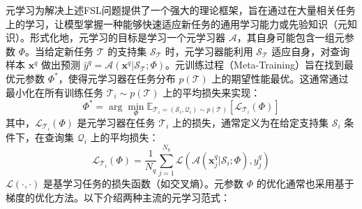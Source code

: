 元学习为解决上述FSL问题提供了一个强大的理论框架，旨在通过在大量相关任务上的学习，让模型掌握一种能够快速适应新任务的通用学习能力或先验知识（元知识）。形式化地，元学习的目标是学习一个元学习器 $\mathcal{A}$，其自身可能包含一组元参数 $\Phi$。当给定新任务 $\mathcal{T}$ 的支持集 $\mathcal{S}_{\mathcal{T}}$ 时，元学习器能利用 $\mathcal{S}_{\mathcal{T}}$ 适应自身，对查询样本 $\mathbf{x}^q$ 做出预测 $\hat{y}^q = \mathcal{A}(\mathbf{x}^q | \mathcal{S}_{\mathcal{T}}; \Phi)$。元训练过程（Meta-Training）旨在找到最优元参数 $\Phi^*$，使得元学习器在任务分布 $p(\mathcal{T})$ 上的期望性能最优。这通常通过最小化在所有训练任务 $\mathcal{T}_i \sim p(\mathcal{T})$ 上的平均损失来实现：
\begin{equation}
    \Phi^* = \arg\min_{\Phi} \mathbb{E}_{\mathcal{T}_i=(\mathcal{S}_i, \mathcal{Q}_i) \sim p(\mathcal{T})} [\mathcal{L}_{\mathcal{T}_i}(\Phi)]
    \label{eq:meta_objective}
\end{equation}
其中，$\mathcal{L}_{\mathcal{T}_i}(\Phi)$ 是元学习器在任务 $\mathcal{T}_i$ 上的损失，通常定义为在给定支持集 $\mathcal{S}_i$ 条件下，在查询集 $\mathcal{Q}_i$ 上的平均损失：
\begin{equation}
    \mathcal{L}_{\mathcal{T}_i}(\Phi) = \frac{1}{N_q} \sum_{j=1}^{N_q} \mathcal{L}( \mathcal{A}(\mathbf{x}_j^q | \mathcal{S}_i; \Phi), y_j^q )
    \label{eq:task_loss_meta}
\end{equation}
$\mathcal{L}(\cdot, \cdot)$ 是基学习任务的损失函数（如交叉熵）。元参数 $\Phi$ 的优化通常也采用基于梯度的优化方法。以下介绍两种主流的元学习范式：

